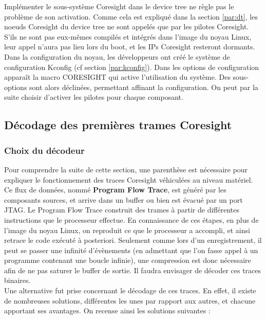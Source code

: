 Implémenter le sous-système Coresight dans le device tree ne règle pas le
problème de son activation. Comme cela est expliqué dans la section
\ref{par:dt}, les noeuds Coresight du device tree ne sont appelés que par les
pilotes Coresight.  S'ils ne sont pas eux-mêmes compilés et intégrés dans
l'image du noyau Linux, leur appel n'aura pas lieu lors du boot, et les IPs
Coresight resteront dormants. Dans la configuration du noyau, les développeurs
ont créé le système de configuration Kconfig (cf section \ref{par:kconfig}).
Dans les options de configuration apparaît la macro CORESIGHT qui active
l'utilisation du système.  Des sous-options sont alors déclinées, permettant
affinant la configuration.  On peut par la suite choisir d'activer les pilotes
pour chaque composant. \\

\subsection{Décodage des premières trames Coresight}
\label{sec:coresight_traces}

\subsubsection{Choix du décodeur}
\label{sec:decoder_choice}

Pour comprendre la suite de cette section, une parenthèse est nécessaire pour
expliquer le fonctionnement des traces Coresight véhiculées au niveau
matériel. Ce flux de données, nommé \textbf{Program Flow Trace}, est généré
par les composants sources, et arrive dans un buffer ou bien est évacué par un
port JTAG. Le Program Flow Trace construit des trames à partir de différentes
instructions que le processeur effectue. En connaissance de ces étapes, en
plus de l'image du noyau Linux, on reproduit ce que le processeur a accompli,
et ainsi retrace le code exécuté à posteriori.  Seulement comme lors d'un
enregistrement, il peut se passer une infinité d'évènements (en admettant que
l'on fasse appel à un programme contenant une boucle infinie), une compression
est donc nécessaire afin de ne pas saturer le buffer de sortie. Il faudra
envisager de décoder ces traces binaires. \\

Une alternative fut prise concernant le décodage de ces traces. En effet, il
existe de nombreuses solutions, différentes les unes par rapport aux autres,
et chacune apportant ses avantages. On recense ainsi les solutions suivantes : 


